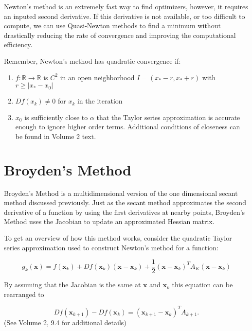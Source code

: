 Newton's method is an extremely fast way to find optimizers, however, it requires an inputed second derivative.
If this derivative is not available, or too difficult to compute, we can use Quasi-Newton methods to find a minimum without drastically reducing the rate of convergence and improving the computational efficiency.

\begin{info}
Remember, Newton's method has quadratic convergence if:
\begin{enumerate}
\item $f: \mathbb{R} \rightarrow \mathbb{R}$ is $C^2$ in an open neighborhood $ I = (x_* - r, x_* + r)$ with $r \geq |x_* - x_0|$
\item $Df(x_k) \neq 0$ for $x_k$ in the iteration
\item $x_0$ is sufficiently close to $\alpha$ that the Taylor series approximation is accurate enough to ignore higher order terms. Additional conditions of closeness can be found in Volume 2 text.
\end{enumerate}
\end{info}

\section*{Broyden's Method}
Broyden's Method is a multidimensional version of the one dimensional secant method discussed previously.
Just as the secant method approximates the second derivative of a function by using the first derivatives at nearby points, Broyden's Method uses the Jacobian to update an approximated Hessian matrix.

To get an overview of how this method works, consider the quadratic Taylor series approximation used to construct Newton's method for a function:

\begin{equation}
g_k(\mathbf{x}) = f(\mathbf{x}_k) + Df(\mathbf{x}_k)(\mathbf{x} - \mathbf{x}_k) + \frac{1}{2}(\mathbf{x} - \mathbf{x}_k)^TA_K(\mathbf{x} - \mathbf{x}_k)
\end{equation}

\noindent By assuming that the Jacobian is the same at $\mathbf{x}$ and $\mathbf{x}_k$ this equation can be rearranged to

\begin{equation} \label{Eq:BroydenRestraint}
Df(\mathbf{x}_{k+1})-Df(\mathbf{x}_k)=(\mathbf{x}_{k+1}-\mathbf{x}_k)^TA_{k+1}.
\end{equation}
(See Volume 2, 9.4 for additional details)


